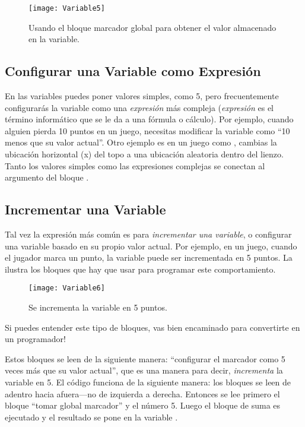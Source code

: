 \begin{figure}[H]
\centering
\texttt{[image: Variable5]}
\caption{Usando el bloque marcador global para obtener el valor
  almacenado en la variable.}
\label{fig:Variable5}
\end{figure}

\subsection*{Configurar una Variable como Expresión}

En las variables puedes poner valores simples, como 5, pero
frecuentemente configurarás la variable como una \emph{expresión} más
compleja (\emph{expresión} es el término informático que se le da a
una fórmula o cálculo). Por ejemplo, cuando alguien pierda 10 puntos
en un juego, necesitas modificar la variable  como
``10 menos que su valor actual''. Otro ejemplo es en un juego como
, cambias la ubicación horizontal (x) del topo
a una ubicación aleatoria dentro del lienzo. Tanto los valores simples
como las expresiones complejas se conectan al argumento del bloque
.

\subsection*{Incrementar una Variable}

Tal vez la expresión más común es para \emph{incrementar una
  variable}, o configurar una variable basado en su propio valor
actual. Por ejemplo, en un juego, cuando el jugador marca un punto, la
variable  puede ser incrementada en 5
puntos. La~ ilustra los bloques que hay que usar
para programar este comportamiento.

\begin{figure}[H]
\vspace{3em}
\centering
\texttt{[image: Variable6]}
\caption{Se incrementa la variable  en 5 puntos.}
\label{fig:Variable6}
\end{figure}

Si puedes entender este tipo de bloques, vas bien encaminado para
convertirte en un programador!

Estos bloques se leen de la siguiente manera: ``configurar el marcador
como 5 veces más que su valor actual'', que es una manera para decir,
\emph{incrementa} la variable en 5. El código funciona de la siguiente
manera: los bloques se leen de adentro hacia afuera---no de izquierda
a derecha.  Entonces se lee primero el bloque ``tomar global
marcador'' y el número 5. Luego el bloque de suma es ejecutado y el
resultado se pone en la variable .

